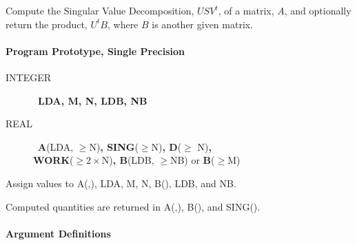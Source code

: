 \documentclass[twoside]{MATH77}
\begin{document}
Compute the Singular Value Decomposition, $USV^t$, of a matrix, $A$, and
optionally return the product, $U^tB$, where $B$ is another given matrix.

\paragraph{Program Prototype, Single Precision}

\begin{description}
\item[INTEGER]  \ {\bf LDA, M, N, LDB, NB}

\item[REAL]  \ {\bf A}(LDA, $\geq $N){\bf , SING}($\geq $N){\bf , D}($\geq $%
N){\bf ,\\ WORK}($\geq 2\times $N){\bf , B}(LDB, $\geq $NB) or {\bf B}($\geq
$M)
\end{description}

Assign values to A(,), LDA, M, N, B(), LDB, and NB.

\begin{center}
\end{center}

Computed quantities are returned in A(,), B(), and SING().

\paragraph{Argument Definitions}
\end{document}
